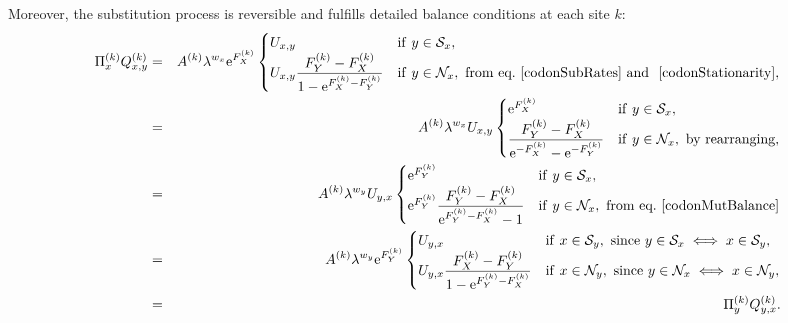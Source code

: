 \documentclass{article}
\newcommand{\e}{\mathrm{e}}
\newcommand{\NonSyn}{\mathcal{N}}
\newcommand{\Syn}{\mathcal{S}}
\newcommand{\NxNonSyn}{\NonSyn_x}
\newcommand{\NyNonSyn}{\NonSyn_y}
\newcommand{\NxSyn}{\Syn_x}
\newcommand{\NySyn}{\Syn_y}
\begin{document}
    Moreover, the substitution process is reversible and fulfills detailed balance conditions at each site $k$:
    \begin{eqnarray}
        \Pi_x^{(k)} Q_{x, y}^{(k)}
        & = & A^{(k)} \lambda^{w_x} \e^{F_X^{(k)}}
        \begin{cases}
            U_{x, y}
            & \mathrm{if} \ y \in \NxSyn,  \\
            U_{x, y} \dfrac{F_Y^{(k)} - F_X^{(k)}}{1 - \e^{F_X^{(k)} - F_Y^{(k)}}}
            & \mathrm{if}  \ y \in \NxNonSyn, \ \textrm{from eq.}\ \ref{codonSubRates} \text{ and } \ \ref{codonStationarity},
        \end{cases} \\
        & = & A^{(k)} \lambda^{w_x} U_{x, y}
        \begin{cases}
            \e^{F_X^{(k)}}
            & \mathrm{if} \ y \in \NxSyn,  \\
            \dfrac{F_Y^{(k)} - F_X^{(k)}}{ \e^{-F_X^{(k)}}  - \e^{- F_Y^{(k)}} }
            & \mathrm{if}  \ y \in \NxNonSyn, \ \textrm{by rearranging},
        \end{cases} \\
        & = & A^{(k)} \lambda^{w_y} U_{y, x}
        \begin{cases}
            \e^{F_Y^{(k)}}
            & \mathrm{if} \ y \in \NxSyn , \\
            \e^{F_Y^{(k)}} \dfrac{F_Y^{(k)} - F_X^{(k)}}{ \e^{F_Y^{(k)}-F_X^{(k)}} - 1 }
            & \mathrm{if}  \ y \in \NxNonSyn, \ \textrm{from eq.} \ \ref{codonMutBalance}
        \end{cases} \\
        & = & A^{(k)} \lambda^{w_y} \e^{F_Y^{(k)}}
        \begin{cases}
            U_{y, x}
            & \mathrm{if} \ x \in \NySyn, \ \textrm{since} \ y \in \NxSyn \iff x \in \NySyn,  \\
            U_{y, x} \dfrac{F_X^{(k)} - F_Y^{(k)}}{1 - \e^{F_Y^{(k)}-F_X^{(k)}}}
            & \mathrm{if}  \ x \in \NyNonSyn, \ \textrm{since} \ y \in \NxNonSyn \iff x \in \NyNonSyn,
        \end{cases} \\
        & = & \Pi_y^{(k)} Q_{y, x}^{(k)} .
        \label{codonSubBalance}
    \end{eqnarray}
\end{document}
